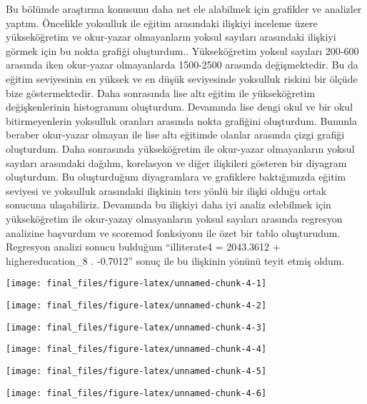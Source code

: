 \documentclass[
  12pt,
]{article}
\begin{document}
Bu bölümde araştırma konusunu daha net ele alabilmek için grafikler ve analizler yaptım. Öncelikle yoksulluk ile eğitim arasındaki ilişkiyi inceleme üzere yükseköğretim ve okur-yazar olmayanların yoksul sayıları arasındaki ilişkiyi görmek için bu nokta grafiği oluşturdum.. Yükseköğretim yoksul sayıları 200-600 arasında iken okur-yazar olmayanlarda 1500-2500 arasında değişmektedir. Bu da eğitim seviyesinin en yüksek ve en düşük seviyesinde yoksulluk riskini bir ölçüde bize göstermektedir. Daha sonrasında lise altı eğitim ile yükseköğretim değişkenlerinin histogramını oluşturdum. Devamında lise dengi okul ve bir okul bitirmeyenlerin yoksulluk oranları arasında nokta grafiğini oluşturdum. Bununla beraber okur-yazar olmayan ile lise altı eğitimde olanlar arasında çizgi grafiği oluşturdum. Daha sonrasında yükseköğretim ile okur-yazar olmayanların yoksul sayıları arasındaki dağılım, korelasyon ve diğer ilişkileri gösteren bir diyagram oluşturdum. Bu oluşturduğum diyagramlara ve grafiklere baktığımızda eğitim seviyesi ve yoksulluk arasındaki ilişkinin ters yönlü bir ilişki olduğu ortak sonucuna ulaşabiliriz. Devamında bu ilişkiyi daha iyi analiz edebilmek için yükseköğretim ile okur-yazay olmayanların yoksul sayıları arasında regresyon analizine başvurdum ve scoremod fonksiyonu ile özet bir tablo oluşturudum. Regresyon analizi sonucu bulduğum ``illiterate4 = 2043.3612 + highereducation\_8 . -0.7012'' sonuç ile bu ilişkinin yönünü teyit etmiş oldum.

\begin{center}\texttt{[image: final\_files/figure-latex/unnamed-chunk-4-1]} \end{center}

\begin{center}\texttt{[image: final\_files/figure-latex/unnamed-chunk-4-2]} \end{center}

\begin{center}\texttt{[image: final\_files/figure-latex/unnamed-chunk-4-3]} \end{center}

\begin{center}\texttt{[image: final\_files/figure-latex/unnamed-chunk-4-4]} \end{center}

\begin{center}\texttt{[image: final\_files/figure-latex/unnamed-chunk-4-5]} \end{center}

\begin{center}\texttt{[image: final\_files/figure-latex/unnamed-chunk-4-6]} \end{center}
\end{document}

